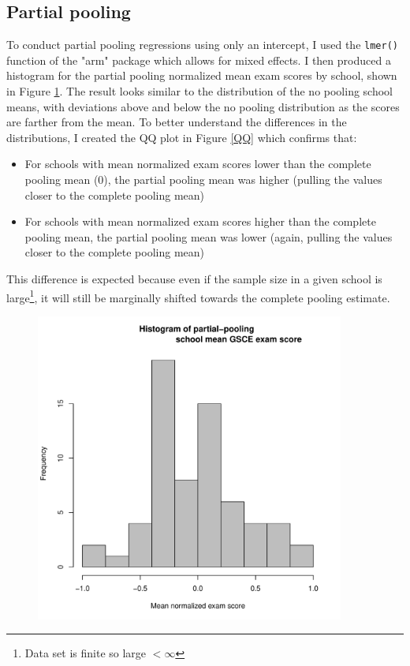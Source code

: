 \documentclass{article}
\begin{document}
\subsection{Partial pooling}
To conduct partial pooling regressions using only an intercept, I used the \verb|lmer()| function of the "arm" package which allows for mixed effects. I then produced a histogram for the partial pooling normalized mean exam scores by school, shown in Figure \ref{partial pooling}. The result looks similar to the distribution of the no pooling school means, with deviations above and below the no pooling distribution as the scores are farther from the mean. To better understand the differences in the distributions, I created the QQ plot in Figure \ref{QQ} which confirms that:
\begin{itemize}
\item For schools with mean normalized exam scores lower than the complete pooling mean (0), the partial pooling mean was higher (pulling the values closer to the complete pooling mean)
\item For schools with mean normalized exam scores higher than the complete pooling mean, the partial pooling mean was lower (again, pulling the values closer to the complete pooling mean)
\end{itemize}

This difference is expected because even if the sample size in a given school is large\footnote{Data set is finite so large $< \infty$}, it will still be marginally shifted towards the complete pooling estimate.


\begin{figure}[H]
\centering
\includegraphics[width = 4in]{figures/partial_pooling.pdf}
\caption{}
\label{partial pooling}
\end{figure}
\end{document}
